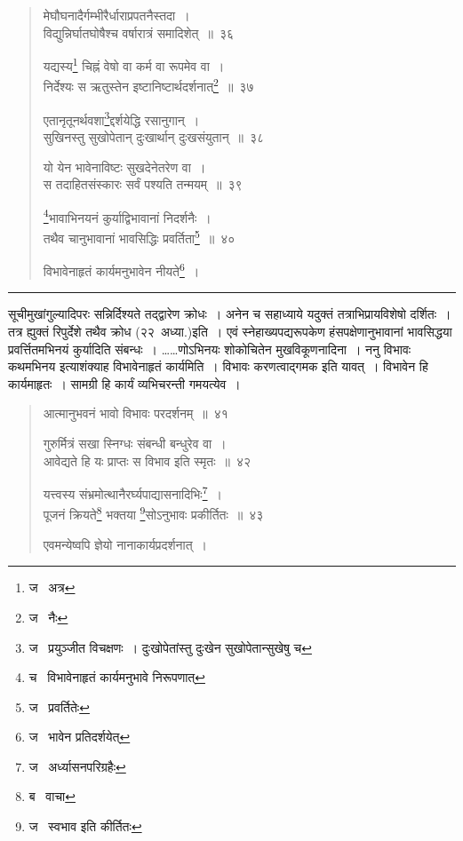 \documentclass[11pt, openany]{book}
\begin{document}
\begin{quote}
{\na मेघौघनादैर्गम्भीरैर्धाराप्रपतनैस्तदा~।\\
विद्युन्निर्घातघोषैश्च वर्षारात्रं समादिशेत्~॥~३६

यद्यस्य\renewcommand{\thefootnote}{1}\footnote{ज \textendash\  अत्र} चिह्नं वेषो वा कर्म वा रूपमेव वा~।\\
निर्देश्यः स ऋतुस्तेन इष्टानिष्टार्थदर्शनात्\renewcommand{\thefootnote}{2}\footnote{ज \textendash\  नैः}~॥~३७

एतानृतूनर्थवशा\renewcommand{\thefootnote}{3}\footnote{ज \textendash\  प्रयुञ्जीत विचक्षणः~। दुःखोपेतांस्तु दुःखेन सुखोपेतान्सुखेषु च}द्दर्शयेद्धि रसानुगान्~।\\
सुखिनस्तु सुखोपेतान् दुःखार्थान् दुःखसंयुतान्~॥~३८

यो येन भावेनाविष्टः सुखदेनेतरेण वा~।\\
स तदाहितसंस्कारः सर्वं पश्यति तन्मयम्~॥~३९

\renewcommand{\thefootnote}{4}\footnote{च \textendash\  विभावेनाहृतं कार्यमनुभावे निरूपणात्}भावाभिनयनं कुर्याद्विभावानां निदर्शनैः~।\\
तथैव चानुभावानां भावसिद्धिः प्रवर्तिता\renewcommand{\thefootnote}{5}\footnote{ज \textendash\  प्रवर्तितेः}~॥~४०

विभावेनाहृतं कार्यमनुभावेन नीयते\renewcommand{\thefootnote}{6}\footnote{ज \textendash\  भावेन प्रतिदर्शयेत्}~।}
\end{quote}

\hrule

\vspace{2mm}
\noindent
सूचीमुखांगुल्यादिपरः सन्निर्दिश्यते तद्द्वारेण क्रोधः~। अनेन च सहाध्याये यदुक्तं तत्राभिप्रायविशेषो दर्शितः~। तत्र ह्युक्तं {\qt रिपुर्देशे तथैव क्रोध} (२२\textendash\ अध्या.)इति~। एवं स्नेहाख्यपद्यरूपकेण हंसपक्षेणानुभावानां भावसिद्धया प्रवर्त्तितमभिनयं कुर्यादिति संबन्धः~। \ldots \ldots णोऽभिनयः शोकोचितेन मुखविकूणनादिना~। ननु विभावः कथमभिनय इत्याशंक्याह विभावेनाहृतं कार्यमिति~। विभावः करणत्वाद्गमक इति यावत्~। विभावेन हि कार्यमाहृतः~। सामग्री हि कार्यं व्यभिचरन्ती गमयत्येव~।

\newpage

\begin{quote}
{\na आत्मानुभवनं भावो विभावः परदर्शनम्~॥~४१

गुरुर्मित्रं सखा स्निग्धः संबन्धी बन्धुरेव वा~।\\
आवेद्यते हि यः प्राप्तः स विभाव इति स्मृतः~॥~४२

यत्त्वस्य संभ्रमोत्थानैरर्घ्यपाद्यासनादिभिः\renewcommand{\thefootnote}{1}\footnote{ज \textendash\  अर्ध्यासनपरिग्रहैः}~।\\
पूजनं क्रियते\renewcommand{\thefootnote}{2}\footnote{ब \textendash\  वाचा} भक्तया \renewcommand{\thefootnote}{3}\footnote{ज \textendash\  स्वभाव इति कीर्तितः}सोऽनुभावः प्रकीर्तितः~॥~४३

एवमन्येष्वपि ज्ञेयो नानाकार्यप्रदर्शनात्~।}
\end{quote}
\end{document}
